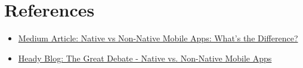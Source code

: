 \documentclass{article}
\begin{document}
\section{References}
\begin{itemize}
    \item \href{https://medium.com/swlh/native-vs-non-native-mobile-apps-whats-the-difference-b3a641e06f52}{Medium Article: Native vs Non-Native Mobile Apps: What’s the Difference?}
    
    \item \href{https://www.heady.io/blog/the-great-debate-native-vs.-non-native-mobile-apps#:~:text=that%20are%20available.-,Native%20apps%20are%20designed%20exclusively%20for%20a%20specific%20operating%20system,but%20may%20have%20performance%20limitations}{Heady Blog: The Great Debate - Native vs. Non-Native Mobile Apps}
\end{itemize}
\end{document}
